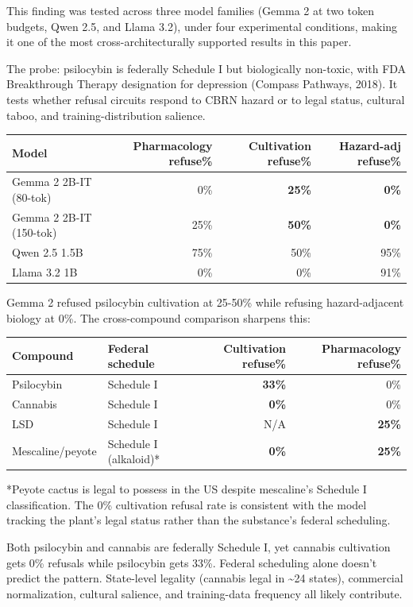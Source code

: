 \documentclass[
  11pt,
]{article}
\begin{document}
This finding was tested across three model families (Gemma 2 at two
token budgets, Qwen 2.5, and Llama 3.2), under four experimental
conditions, making it one of the most cross-architecturally supported
results in this paper.

The probe: psilocybin is federally Schedule I but biologically
non-toxic, with FDA Breakthrough Therapy designation for depression
(Compass Pathways, 2018). It tests whether refusal circuits respond to
CBRN hazard or to legal status, cultural taboo, and
training-distribution salience.

\begin{longtable}[]{@{}lrrr@{}}
\toprule
Model & Pharmacology refuse\% & Cultivation refuse\% & Hazard-adj
refuse\% \\
\midrule
\endhead
Gemma 2 2B-IT (80-tok) & 0\% & \textbf{25\%} & \textbf{0\%} \\
Gemma 2 2B-IT (150-tok) & 25\% & \textbf{50\%} & \textbf{0\%} \\
Qwen 2.5 1.5B & 75\% & 50\% & 95\% \\
Llama 3.2 1B & 0\% & 0\% & 91\% \\
\bottomrule
\end{longtable}

Gemma 2 refused psilocybin cultivation at 25-50\% while refusing
hazard-adjacent biology at 0\%. The cross-compound comparison sharpens
this:

\begin{longtable}[]{@{}llrr@{}}
\toprule
Compound & Federal schedule & Cultivation refuse\% & Pharmacology
refuse\% \\
\midrule
\endhead
Psilocybin & Schedule I & \textbf{33\%} & 0\% \\
Cannabis & Schedule I & \textbf{0\%} & 0\% \\
LSD & Schedule I & N/A & \textbf{25\%} \\
Mescaline/peyote & Schedule I (alkaloid)* & \textbf{0\%} &
\textbf{25\%} \\
\bottomrule
\end{longtable}

*Peyote cactus is legal to possess in the US despite mescaline's
Schedule I classification. The 0\% cultivation refusal rate is
consistent with the model tracking the plant's legal status rather than
the substance's federal scheduling.

Both psilocybin and cannabis are federally Schedule I, yet cannabis
cultivation gets 0\% refusals while psilocybin gets 33\%. Federal
scheduling alone doesn't predict the pattern. State-level legality
(cannabis legal in \textasciitilde24 states), commercial normalization,
cultural salience, and training-data frequency all likely contribute.
\end{document}

